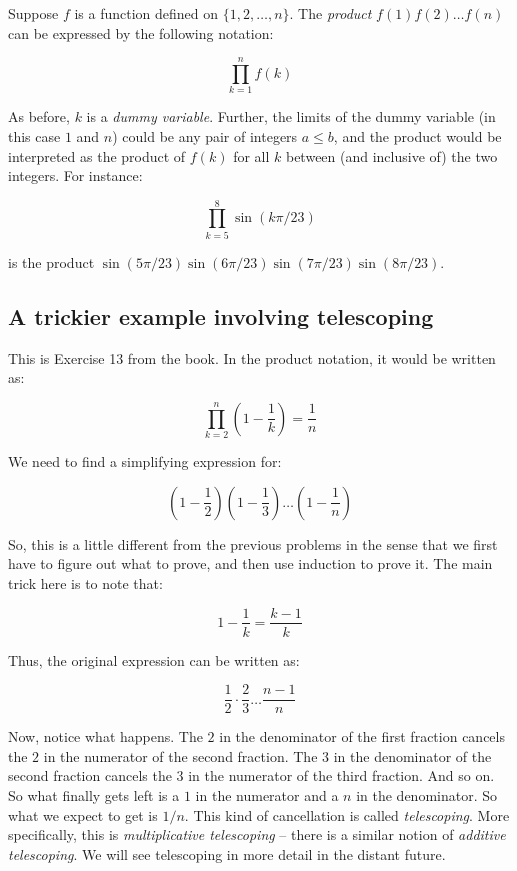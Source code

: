 \documentclass{amsart}
\begin{document}
Suppose $f$ is a function defined on $\{ 1,2,\dots,n\}$. The {\em
product} $f(1)f(2) \dots f(n)$ can be expressed by the following notation:

$$\prod_{k=1}^n f(k)$$

As before, $k$ is a {\em dummy variable}. Further, the limits of the
dummy variable (in this case $1$ and $n$) could be any pair of
integers $a \le b$, and the product would be interpreted as the
product of $f(k)$ for all $k$ between (and inclusive of) the two
integers. For instance:

$$\prod_{k=5}^8 \sin(k\pi/23)$$

is the product $\sin(5\pi/23)\sin(6\pi/23)\sin(7\pi/23)\sin(8\pi/23)$.

\subsection{A trickier example involving telescoping}

This is Exercise 13 from the book. In the product notation, it would
be written as:

$$\prod_{k=2}^n \left(1 - \frac{1}{k}\right) = \frac{1}{n}$$


We need to find a simplifying expression for:

\begin{equation*}
  \left(1 - \frac{1}{2}\right) \left(1 - \frac{1}{3}\right) \dots \left(1 - \frac{1}{n}\right)
\end{equation*}

So, this is a little different from the previous problems in the sense
that we first have to figure out what to prove, and then use induction
to prove it. The main trick here is to note that:

$$1 - \frac{1}{k} = \frac{k - 1}{k}$$

Thus, the original expression can be written as:

\begin{equation*}
  \frac{1}{2} \cdot \frac{2}{3} \dots \frac{n - 1}{n}
\end{equation*}

Now, notice what happens. The $2$ in the denominator of the first
fraction cancels the $2$ in the numerator of the second fraction. The
$3$ in the denominator of the second fraction cancels the $3$ in the
numerator of the third fraction. And so on. So what finally gets left
is a $1$ in the numerator and a $n$ in the denominator. So what we
expect to get is $1/n$. This kind of cancellation is called {\em
telescoping}. More specifically, this is {\em multiplicative
telescoping} -- there is a similar notion of {\em additive
telescoping}. We will see telescoping in more detail in the distant
future.
\end{document}
